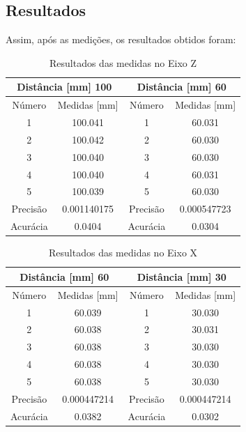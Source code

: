 \subsection{Resultados} 
Assim, após as medições, os resultados obtidos foram: 

\begin{table}[H]
\centering
\caption{Resultados das medidas no Eixo Z}
\begin{tabular}{|c|c|c|c|}
\hline
\multicolumn{2}{|c|}{Distância [mm] 100} & \multicolumn{2}{|c|}{Distância [mm] 60} \\ \hline
Número & Medidas [mm] & Número & Medidas [mm] \\ \hline
1 & 100.041 & 1 & 60.031 \\ \hline
2 & 100.042 & 2 & 60.030 \\ \hline
3 & 100.040 & 3 & 60.030 \\ \hline
4 & 100.040 & 4 & 60.031 \\ \hline
5 & 100.039 & 5 & 60.030 \\ \hline
Precisão & 0.001140175 & Precisão & 0.000547723 \\ \hline
Acurácia & 0.0404 & Acurácia & 0.0304 \\ \hline
\end{tabular}
\end{table}

\begin{table}[H]
\centering
\caption{Resultados das medidas no Eixo X}
\begin{tabular}{|c|c|c|c|}
\hline
\multicolumn{2}{|c|}{Distância [mm] 60} & \multicolumn{2}{|c|}{Distância [mm] 30} \\ \hline
Número & Medidas [mm] & Número & Medidas [mm] \\ \hline
1 & 60.039 & 1 & 30.030 \\ \hline
2 & 60.038 & 2 & 30.031 \\ \hline
3 & 60.038 & 3 & 30.030 \\ \hline
4 & 60.038 & 4 & 30.030 \\ \hline
5 & 60.038 & 5 & 30.030 \\ \hline
Precisão & 0.000447214 & Precisão & 0.000447214 \\ \hline
Acurácia & 0.0382 & Acurácia & 0.0302 \\ \hline
\end{tabular}
\end{table}
